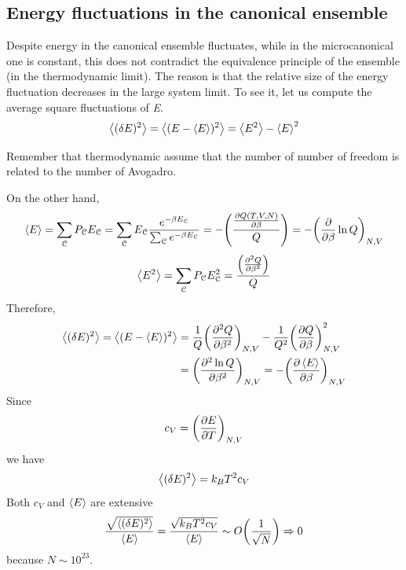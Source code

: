 \documentclass[../main/main.tex]{subfiles}
\begin{document}
\subsection{Energy fluctuations in the canonical ensemble}
Despite energy in the canonical ensemble fluctuates, while in the microcanonical one is constant, this does not contradict the equivalence principle of the ensemble (in the thermodynamic limit). The reason is that the relative size of the energy fluctuation decreases in the large system limit. 
To see it, let us compute the average square fluctuations of \emph{E}.
\begin{equation}
\expval{(\delta E)^2} = \expval{(E- \expval{E} )^2} = \expval{E^2} - \expval{E}^2
\end{equation}
\begin{remark}
Remember that thermodynamic assume that the number of number of freedom is related to the number of Avogadro.
\end{remark}
On the other hand,
\begin{equation*}
  \expval{E} = \sum_{\mathcal{C}}^{} P_{\mathcal{C}} E_{\mathcal{C}} = \sum_{\mathcal{C}}^{} E_{\mathcal{C}} \frac{e^{-\beta E_{\mathcal{C}}} }{\sum_{\mathcal{C}}^{} e^{-\beta E_{\mathcal{C}}}  }
   = - \qty( \frac{\pdv{Q (T,V,N)}{\beta }}{Q} ) = - \qty(\pdv{}{\beta } \ln{Q})_{N,V}
\end{equation*}
\begin{equation*}
  \expval{E^2} = \sum_{\mathcal{C}}^{} P_{\mathcal{C}} E_{\mathcal{C}}^2 = \frac{\qty(\pdv[2]{Q}{\beta } )}{Q}
\end{equation*}
Therefore,
\begin{equation*}
\begin{split}
  \expval{(\delta E)^2} = \expval{(E- \expval{E} )^2}  &= \frac{1}{Q} \qty(\pdv[2]{Q}{\beta } )_{N,V} - \frac{1}{Q^2} \qty(\pdv{Q}{\beta } )^2_{N,V}\\
  & =  \qty( \pdv[2]{\ln{Q} }{\beta} )_{N,V} = - \qty(\pdv{\expval{E} }{\beta } )_{N,V}
\end{split}
\end{equation*}
Since
\begin{equation}
  c_V = \qty(\pdv{E}{T} )_{N,V}
\end{equation}
we have
\begin{equation}
  \expval{(\delta E)^2} = k_B T^2 c_V
\end{equation}
Both \( c_V \) and \( \expval{E}  \) are extensive
\begin{equation*}
  \frac{\sqrt{\expval{(\delta E)^2} } }{\expval{E} } = \frac{\sqrt{k_B T^2 c_V} }{\expval{E} } \sim O \qty(\frac{1}{\sqrt{N} }) \Rightarrow 0
\end{equation*}
because \( N \sim 10^{23} \).
\end{document}
